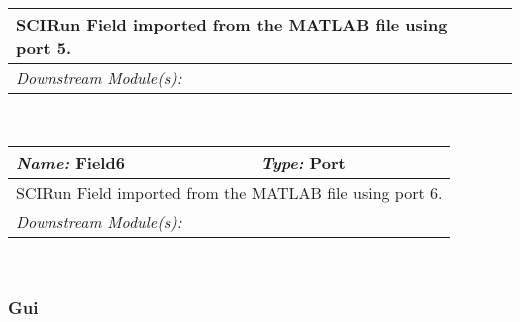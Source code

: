 \begin{centering}
\begin{tabular}{|p{6cm}|p{6cm}|}
{ SCIRun Field imported from the MATLAB file using port 5. 

}\\ \hline
\multicolumn{2}{|p{12cm}|}{\emph{Downstream Module(s):} }\\ \hline
\end{tabular} \\
\vspace{0.25cm}
\begin{tabular}{|p{6cm}|p{6cm}|} \hline
{\emph{Name:} Field6}&{\emph{Type:} Port}\\ \hline
\multicolumn{2}{|p{12cm}|}{

 SCIRun Field imported from the MATLAB file using port 6. 

}\\ \hline
\multicolumn{2}{|p{12cm}|}{\emph{Downstream Module(s):} }\\ \hline
\end{tabular} \\
\vspace{0.25cm}
\end{centering}
\subsubsection*{Gui}


